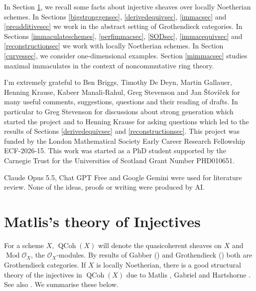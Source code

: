 \documentclass[12pt,oneside]{amsart}
\DeclareMathOperator{\Mod}{Mod}
\DeclareMathOperator{\QCoh}{QCoh}
\begin{document}
In Section \ref{Matlissec}, we recall some facts about injective sheaves over locally Noetherian schemes. In Sections \ref{bigstronggensec}, \ref{derivedequivsec}, \ref{immacsec} and \ref{preadditivesec} we work in the abstract setting of Grothendieck categories. In Sections \ref{immaculateschemes}, \ref{perfimmacsec}, \ref{SODsec}, \ref{immacequivsec} and \ref{reconstructionsec} we work with locally Noetherian schemes. In Section \ref{curvessec}, we consider one-dimensional examples. Section \ref{mimmacsec} studies maximal immaculates in the context of noncommutative ring theory.   
\\



\begin{ack}
I'm extremely grateful to Ben Briggs, Timothy De Deyn, Martin Gallauer, Henning Krause, Kabeer Manali-Rahul, Greg Stevenson and Jan Šťovíček for many useful comments, suggestions, questions and their reading of drafts. In particular to Greg Stevenson for discussions about strong generation which started the project and to Henning Krause for asking questions which led to the results of Sections \ref{derivedequivsec} and \ref{reconstructionsec}. This project was funded by the London Mathematical Society Early Career Research Fellowship ECF-2026-15. This work was started as a PhD student supported by the Carnegie Trust for the
Universities of Scotland Grant Number PHD010651. 
\end{ack}

\begin{AID}
Claude Opus 5.5, Chat GPT Free and Google Gemini were used for literature review. None of the ideas, proofs or writing were produced by AI. 
\end{AID}


\section{Matlis's theory of Injectives}
\label{Matlissec}

For a scheme $X$, $\QCoh(X)$ will denote the quasicoherent sheaves on $X$ and $\Mod \mathcal{O}_X$, the $\mathcal{O}_X$-modules. By results of Gabber (\cite[Tag 077K]{stacks-project}) and Grothendieck (\cite[3.1.1]{Groth57}) both are Grothendieck categories. If $X$ is locally Noetherian, there is a good structural theory of the injectives in $\QCoh(X)$ due to Matlis \cite{Ma58}, Gabriel \cite{Gab62} and Hartshorne \cite{Har66}. See also \cite{Con00}. We summarise these below.
\end{document}
